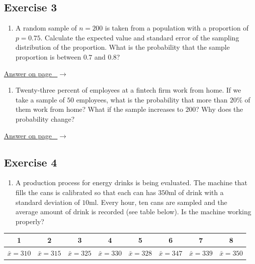 \documentclass[
  11pt,
  letterpaper,
  DIV=11,
  numbers=noendperiod,
  oneside,
  open=any]{scrreprt}
\providecommand{\tightlist}{%
  \setlength{\itemsep}{0pt}\setlength{\parskip}{0pt}}\usepackage{longtable,booktabs,array}
\newcommand{\bsanswerref}[1]{%
  \par\nopagebreak\hypertarget{q-#1}{}\label{q-#1}%
  {\raggedleft\sffamily\footnotesize\hyperlink{a-#1}{\textcolor{bsaccent}{Answer on page \pageref{a-#1}\ $\rightarrow$}}\par}%
  \medskip}
\begin{document}
\subsection*{Exercise 3}\label{exercise-3-9}

\begin{enumerate}
\def\labelenumi{\arabic{enumi}.}
\tightlist
\item
  A random sample of \(n=200\) is taken from a population with a
  proportion of \(p=0.75\). Calculate the expected value and standard
  error of the sampling distribution of the proportion. What is the
  probability that the sample proportion is between \(0.7\) and \(0.8\)?
\end{enumerate}

\bsanswerref{bsans109}

\begin{enumerate}
\def\labelenumi{\arabic{enumi}.}
\setcounter{enumi}{1}
\tightlist
\item
  Twenty-three percent of employees at a fintech firm work from home. If
  we take a sample of \(50\) employees, what is the probability that
  more than \(20\%\) of them work from home? What if the sample
  increases to \(200\)? Why does the probability change?
\end{enumerate}

\bsanswerref{bsans110}

\subsection*{Exercise 4}\label{exercise-4-7}

\begin{enumerate}
\def\labelenumi{\arabic{enumi}.}
\tightlist
\item
  A production process for energy drinks is being evaluated. The machine
  that fills the cans is calibrated so that each can has \(350\)ml of
  drink with a standard deviation of \(10\)ml. Every hour, ten cans are
  sampled and the average amount of drink is recorded (see table below).
  Is the machine working properly?
\end{enumerate}

\begin{center}
\begin{tabular}{cccccccc}
\toprule
1 & 2 & 3 & 4 & 5 & 6 & 7 & 8 \\
\midrule
\(\bar{x}=310\) & \(\bar{x}=315\) & \(\bar{x}=325\) & \(\bar{x}=330\) & \(\bar{x}=328\) & \(\bar{x}=347\) & \(\bar{x}=339\) & \(\bar{x}=350\) \\
\bottomrule
\end{tabular}
\end{center}
\end{document}
